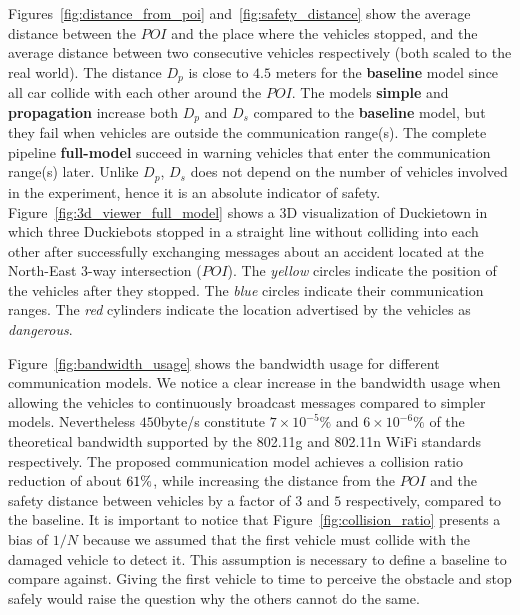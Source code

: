 Figures~\ref{fig:distance_from_poi} and~\ref{fig:safety_distance} show the average distance 
between the $POI$ and the place where the vehicles stopped, and the average distance 
between two consecutive vehicles respectively (both scaled to the real world).
The distance $D_p$ is close to $4.5$ meters for the \textbf{baseline} model since all car collide with each
other around the $POI$. The models \textbf{simple} and \textbf{propagation} increase both
$D_p$ and $D_s$ compared to the \textbf{baseline} model, but they fail when vehicles are outside the communication range(s).
The complete pipeline \textbf{full-model} succeed in warning vehicles that enter the communication range(s) later.
Unlike $D_p$, $D_s$ does not depend on the number of vehicles involved in the experiment, hence it
is an absolute indicator of safety. Figure~\ref{fig:3d_viewer_full_model} shows a 3D visualization of Duckietown
in which three Duckiebots stopped in a straight line without colliding into each other
after successfully exchanging messages about an accident located at the North-East 3-way intersection ($POI$).
The \textit{yellow} circles indicate the position of the vehicles after they stopped.
The \textit{blue} circles indicate their communication ranges. The \textit{red} cylinders
indicate the location advertised by the vehicles as \textit{dangerous}.

Figure~\ref{fig:bandwidth_usage} shows the bandwidth usage for different communication models.
We notice a clear increase in the bandwidth usage when allowing the vehicles to continuously broadcast messages
compared to simpler models. Nevertheless $450$byte/s constitute $7 \times 10^{-5}\%$ and
$6 \times 10^{-6}\%$ of the theoretical bandwidth supported by the 802.11g and 802.11n WiFi standards respectively.
The proposed communication model achieves a collision ratio reduction of about $\collision_ratio_reduction_perc\%$,
while increasing the distance from the $POI$ and the safety distance between vehicles by a factor of
$3$ and $5$ respectively, compared to the baseline.
It is important to notice that Figure~\ref{fig:collision_ratio} presents a bias of $1/N$ because we assumed that
the first vehicle must collide with the damaged vehicle to detect it. This assumption is necessary to define a
baseline to compare against. Giving the first vehicle to time to perceive the obstacle and stop safely would
raise the question why the others cannot do the same.
